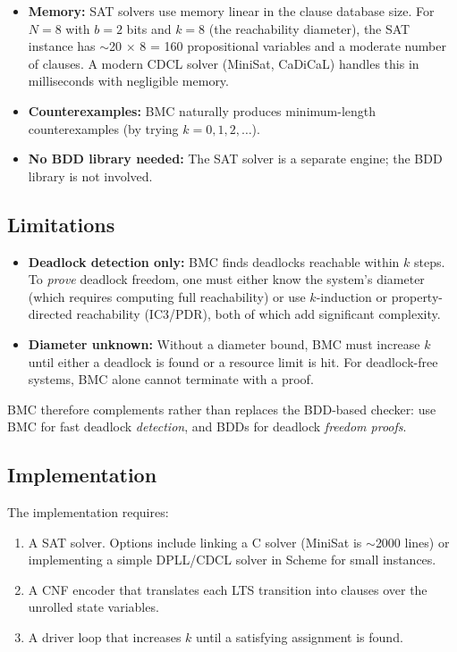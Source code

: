 \documentclass[11pt]{article}
\begin{document}
\begin{itemize}
\item \textbf{Memory:}  SAT solvers use memory linear in the clause
  database size.  For $N = 8$ with $b = 2$ bits and $k = 8$ (the
  reachability diameter), the SAT instance has $\sim$20 $\times$
  8 = 160 propositional variables and a moderate number of clauses.
  A modern CDCL solver (MiniSat, CaDiCaL) handles this in
  milliseconds with negligible memory.
\item \textbf{Counterexamples:}  BMC naturally produces minimum-length
  counterexamples (by trying $k = 0, 1, 2, \ldots$).
\item \textbf{No BDD library needed:}  The SAT solver is a separate
  engine; the BDD library is not involved.
\end{itemize}

\subsection{Limitations}

\begin{itemize}
\item \textbf{Deadlock detection only:}  BMC finds deadlocks reachable
  within $k$ steps.  To \emph{prove} deadlock freedom, one must either
  know the system's diameter (which requires computing full
  reachability) or use $k$-induction or property-directed
  reachability (IC3/PDR), both of which add significant complexity.
\item \textbf{Diameter unknown:}  Without a diameter bound, BMC must
  increase $k$ until either a deadlock is found or a resource limit
  is hit.  For deadlock-free systems, BMC alone cannot terminate with
  a proof.
\end{itemize}

BMC therefore complements rather than replaces the BDD-based checker:
use BMC for fast deadlock \emph{detection}, and BDDs for deadlock
\emph{freedom proofs}.

\subsection{Implementation}

The implementation requires:
\begin{enumerate}
\item A SAT solver.  Options include linking a C solver (MiniSat is
  $\sim$2000 lines) or implementing a simple DPLL/CDCL solver in
  Scheme for small instances.
\item A CNF encoder that translates each LTS transition into clauses
  over the unrolled state variables.
\item A driver loop that increases $k$ until a satisfying assignment
  is found.
\end{enumerate}
\end{document}
